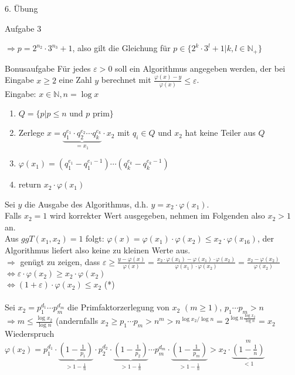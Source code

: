 \begin{section}{6. Übung}
\begin{subsection}{Aufgabe 3}
\begin{enumerate}[a)]
  $\Rightarrow p = 2^{n_2} \cdot 3^{n_3}+1$, also gilt die Gleichung für $p \in \{2^k\cdot3^l+1| k,l \in \mathbb{N}_+\}$
 \end{enumerate} 
 \end{subsection}
 \begin{subsection}{Bonusaufgabe}
  Für jedes $\varepsilon > 0$ soll ein Algorithmus angegeben werden, der bei Eingabe $x \geq 2$ eine Zahl $y$ berechnet mit $\frac{\varphi(x)-y}{\varphi(x)} \leq \varepsilon$.\\
  Eingabe: $x \in \mathbb{N}, n = \log x$
  \begin{enumerate}
   \item $Q=\{p| p \leq n \text{ und } p \text{ prim}\}$
   \item Zerlege $x=\underbrace{q_1^{e_1} \cdot q_2^{e_2} \cdots q_k^{e_k}}_{=x_1} \cdot x_2$ mit $q_i \in Q$ und $x_2$ hat keine Teiler aus $Q$ 
   \item $\varphi(x_1) = (q_1^{e_1}-q_1^{e_1-1})\cdots (q_k^{e_k}-q_k^{e_k-1})$
   \item return $x_2 \cdot \varphi(x_1)$
  \end{enumerate}
  Sei $y$ die Ausgabe des Algorithmus, d.h. $y=x_2\cdot \varphi(x_1)$.\\
  Falls $x_2=1$ wird korrekter Wert ausgegeben, nehmen im Folgenden also $x_2 > 1$ an. \\
  Aus $ggT(x_1,x_2) = 1$ folgt: $\varphi(x) = \varphi(x_1) \cdot \varphi(x_2) \leq x_2 \cdot \varphi(x_16)$, der Algorithmus liefert also keine zu kleinen Werte aus.\\
  $\Rightarrow$ genügt zu zeigen, dass $\varepsilon \geq \frac{y-\varphi(x)}{\varphi(x)} = \frac{x_2 \cdot \varphi(x_1) - \varphi(x_1)\cdot \varphi(x_2)}{\varphi(x_1) \cdot \varphi(x_2)} = \frac{x_2 - \varphi(x_2)}{\varphi(x_2)} $\\
  $\Leftrightarrow \varepsilon \cdot \varphi(x_2) \geq x_2 \cdot \varphi(x_2)$\\
  $ \Leftrightarrow (1+\varepsilon) \cdot \varphi(x_2) \leq x_2$ (*)\\ \\
  Sei $x_2 = p_1^{d_1} \cdots p_m^{d_m}$ die Primfaktorzerlegung von $x_2$ $(m \geq 1)$, $p_1 \cdots p_m > n$\\
  $\Rightarrow m \leq \frac{\log x_2}{\log n}$ (andernfalls $x_2 \geq p_1 \cdots p_m > n^m > n^{\log x_2 / \log n} = 2^{\log n \frac{\log x_2}{\log n}} = x_2 $ Wiederspruch\\
  $\varphi(x_2) = p_1^{d_1}\cdot\underbrace{(1-\frac{1}{p_1})}_{> 1-\frac{1}{n}}\cdot p_2^{d_2}\cdot\underbrace{(1-\frac{1}{p_2})}_{> 1-\frac{1}{n}}\cdots p_m^{d_m}\cdot\underbrace{(1-\frac{1}{p_m})}_{> 1-\frac{1}{n}} > x_2 \cdot \underbrace{(1 - \frac{1}{n})}_{<1}^m $\\

\end{subsection}
\end{section}
